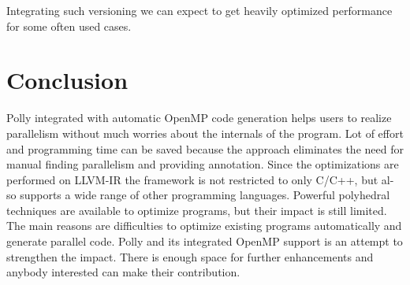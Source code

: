Integrating such versioning we can expect to get heavily optimized performance 
for some often used cases.

\section{Conclusion}
Polly integrated with automatic OpenMP code generation helps users to
realize parallelism without much worries about the internals of the program.
Lot of effort and programming time can be saved because
the approach eliminates the need for manual finding parallelism and providing annotation.
Since the optimizations are performed on LLVM-IR the framework is not restricted to only C/C++, but al-
so supports a wide range of other programming languages.
Powerful polyhedral techniques are available to optimize programs, but their impact is still limited. The main reasons
are difficulties to optimize existing programs automatically and generate parallel code. Polly and its integrated OpenMP support
is an attempt to strengthen the impact. There is enough space for further enhancements
and anybody interested can make their contribution. 
